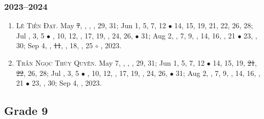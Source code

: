 \documentclass{article}
\begin{document}
\subsubsection{2023--2024}

\begin{enumerate}
	\item \textsc{Lê Tiến Đạt.} May \st{7}, , , , 29, 31; Jun 1, 5, 7, 12 $\bullet$ 14, 15, 19, 21, 22, 26, 28; Jul , 3, 5 $\bullet$ , 10, 12, , 17, 19, , 24, 26,  $\bullet$ 31; Aug 2, , 7, 9, , 14, 16, , 21 $\bullet$ 23, , 30; Sep 4, , \st{11}, , 18, , 25 $\circ$ , 2023.
	\item \textsc{Trần Ngọc Thúy Quyên.} May 7, , , , 29, 31; Jun 1, 5, 7, 12 $\bullet$ 14, 15, 19, \st{21}, \st{22}, 26, 28; Jul , 3, 5 $\bullet$ , 10, 12, , 17, 19, , 24, 26,  $\bullet$ 31; Aug 2, , 7, 9, , 14, 16, , 21 $\bullet$ 23, , 30; Sep 4, , 2023.
\end{enumerate}


\subsection{Grade 9}
\end{document}
